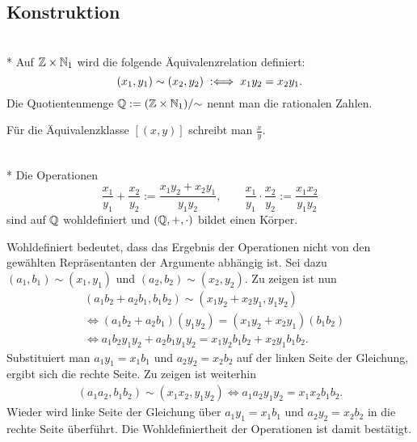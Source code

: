 \subsection{Konstruktion}

\begin{Definition}\mbox{}\\*
Auf $\mathbb Z\times\mathbb N_1$ wird die folgende Äquivalenzrelation definiert:
\[(x_1,y_1)\sim (x_2,y_2) \;:\Longleftrightarrow\; x_1y_2 = x_2y_1.\]
Die Quotientenmenge $\mathbb Q := (\mathbb Z\times\mathbb N_1)/{\sim}$ nennt man
die rationalen Zahlen.
\end{Definition}
Für die Äquivalenzklasse $[(x,y)]$ schreibt man $\frac{x}{y}$.

\begin{Satz}\mbox{}\\*
Die Operationen
\[\frac{x_1}{y_1}+\frac{x_2}{y_2} := \frac{x_1y_2+x_2y_1}{y_1y_2},
\qquad\frac{x_1}{y_1}\cdot \frac{x_2}{y_2} := \frac{x_1x_2}{y_1y_2}\]
sind auf $\mathbb Q$ wohldefiniert und $(\mathbb Q,+,\cdot)$ bildet einen Körper.
\end{Satz}
 Wohldefiniert bedeutet, dass das Ergebnis der
Operationen nicht von den gewählten Repräsentanten der Argumente
abhängig ist. Sei dazu $(a_1,b_1)\sim (x_1,y_1)$ und
$(a_2,b_2)\sim (x_2,y_2)$. Zu zeigen ist nun
\begin{align*}
&(a_1b_2+a_2b_1,b_1b_2)\sim (x_1y_2+x_2y_1,y_1y_2)\\
&\iff (a_1b_2+a_2b_1)(y_1y_2) = (x_1y_2+x_2y_1)(b_1b_2)\\
&\iff a_1b_2 y_1y_2 + a_2b_1y_1y_2 = x_1y_2b_1b_2+x_2y_1b_1b_2.
\end{align*}
Substituiert man $a_1y_1=x_1b_1$ und $a_2y_2=x_2b_2$ auf
der linken Seite der Gleichung, ergibt sich die rechte Seite.
Zu zeigen ist weiterhin
\begin{align*}
(a_1a_2,b_1b_2)\sim (x_1x_2,y_1y_2)
\iff a_1a_2y_1y_2 = x_1x_2b_1b_2.
\end{align*}
Wieder wird linke Seite der Gleichung über $a_1y_1=x_1b_1$
und $a_2y_2=x_2b_2$ in die rechte Seite überführt.
Die Wohldefiniertheit der Operationen ist damit bestätigt.


